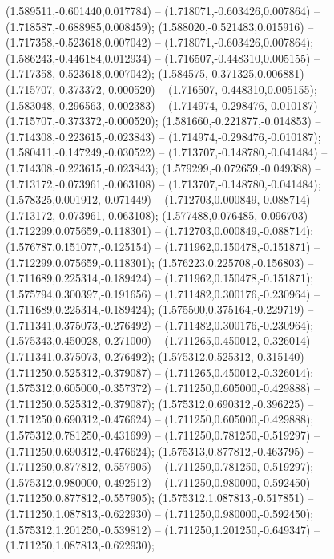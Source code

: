  (1.589511,-0.601440,0.017784) -- (1.718071,-0.603426,0.007864) -- (1.718587,-0.688985,0.008459);
 (1.588020,-0.521483,0.015916) -- (1.717358,-0.523618,0.007042) -- (1.718071,-0.603426,0.007864);
 (1.586243,-0.446184,0.012934) -- (1.716507,-0.448310,0.005155) -- (1.717358,-0.523618,0.007042);
 (1.584575,-0.371325,0.006881) -- (1.715707,-0.373372,-0.000520) -- (1.716507,-0.448310,0.005155);
 (1.583048,-0.296563,-0.002383) -- (1.714974,-0.298476,-0.010187) -- (1.715707,-0.373372,-0.000520);
 (1.581660,-0.221877,-0.014853) -- (1.714308,-0.223615,-0.023843) -- (1.714974,-0.298476,-0.010187);
 (1.580411,-0.147249,-0.030522) -- (1.713707,-0.148780,-0.041484) -- (1.714308,-0.223615,-0.023843);
 (1.579299,-0.072659,-0.049388) -- (1.713172,-0.073961,-0.063108) -- (1.713707,-0.148780,-0.041484);
 (1.578325,0.001912,-0.071449) -- (1.712703,0.000849,-0.088714) -- (1.713172,-0.073961,-0.063108);
 (1.577488,0.076485,-0.096703) -- (1.712299,0.075659,-0.118301) -- (1.712703,0.000849,-0.088714);
 (1.576787,0.151077,-0.125154) -- (1.711962,0.150478,-0.151871) -- (1.712299,0.075659,-0.118301);
 (1.576223,0.225708,-0.156803) -- (1.711689,0.225314,-0.189424) -- (1.711962,0.150478,-0.151871);
 (1.575794,0.300397,-0.191656) -- (1.711482,0.300176,-0.230964) -- (1.711689,0.225314,-0.189424);
 (1.575500,0.375164,-0.229719) -- (1.711341,0.375073,-0.276492) -- (1.711482,0.300176,-0.230964);
 (1.575343,0.450028,-0.271000) -- (1.711265,0.450012,-0.326014) -- (1.711341,0.375073,-0.276492);
 (1.575312,0.525312,-0.315140) -- (1.711250,0.525312,-0.379087) -- (1.711265,0.450012,-0.326014);
 (1.575312,0.605000,-0.357372) -- (1.711250,0.605000,-0.429888) -- (1.711250,0.525312,-0.379087);
 (1.575312,0.690312,-0.396225) -- (1.711250,0.690312,-0.476624) -- (1.711250,0.605000,-0.429888);
 (1.575312,0.781250,-0.431699) -- (1.711250,0.781250,-0.519297) -- (1.711250,0.690312,-0.476624);
 (1.575313,0.877812,-0.463795) -- (1.711250,0.877812,-0.557905) -- (1.711250,0.781250,-0.519297);
 (1.575312,0.980000,-0.492512) -- (1.711250,0.980000,-0.592450) -- (1.711250,0.877812,-0.557905);
 (1.575312,1.087813,-0.517851) -- (1.711250,1.087813,-0.622930) -- (1.711250,0.980000,-0.592450);
 (1.575312,1.201250,-0.539812) -- (1.711250,1.201250,-0.649347) -- (1.711250,1.087813,-0.622930);
